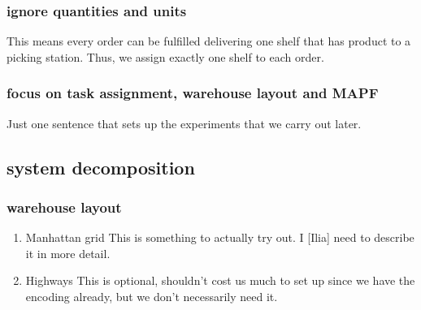 \documentclass[11pt]{article}
\begin{document}
\subsubsection{ignore quantities and units}
\label{sec:org71162d9}
This means every order can be fulfilled delivering one shelf that has product to a picking station.
Thus, we assign exactly one shelf to each order.
\subsubsection{focus on task assignment, warehouse layout and MAPF}
\label{sec:org72bcd20}
Just one sentence that sets up the experiments that we carry out later.
\subsection{system decomposition}
\label{sec:orgedb91b1}
\subsubsection{warehouse layout}
\label{sec:orgc35c229}
\begin{enumerate}
\item Manhattan grid
\label{sec:org46e2239}
This is something to actually try out. I [Ilia] need to describe it in more detail.
\item Highways
\label{sec:orgf14c0c7}
This is optional, shouldn't cost us much to set up since we have the encoding already, but we don't necessarily need it.
\end{enumerate}
\end{document}
